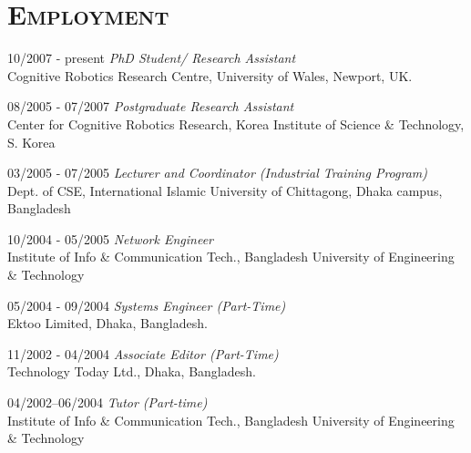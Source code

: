 \documentclass[notopicbreak,contbibnum,plain]{simplecv}
\begin{document}
\section{\textsc{Employment}}
\begin{topic}
	\item[10/2007 - present] \textit{PhD Student/ Research Assistant}\\
    Cognitive Robotics Research Centre,
    University of Wales, Newport, UK.
\vspace*{-0.1cm}    
    \item[08/2005 - 07/2007] \textit{Postgraduate Research Assistant\\}
    Center for Cognitive Robotics Research,
    Korea Institute of Science \& Technology, S. Korea
\vspace*{-0.1cm}
\item[03/2005 - 07/2005] \textit{Lecturer and Coordinator (Industrial Training Program)}\\
	Dept. of CSE, International Islamic University of Chittagong, Dhaka campus, Bangladesh
\vspace*{-0.1cm}    
    \item[10/2004 - 05/2005] \textit{Network Engineer}\\
	Institute of Info \& Communication Tech.,
	Bangladesh University of Engineering \& Technology
\vspace*{-0.1cm}
	\item[05/2004 - 09/2004]\textit{ Systems Engineer (Part-Time)}\\
	Ektoo Limited, Dhaka, Bangladesh.
\vspace*{-0.1cm}
	\item[11/2002 - 04/2004] \textit{Associate Editor (Part-Time)}\\
	Technology Today Ltd., Dhaka, Bangladesh.
\vspace*{-0.1cm}
	\item[04/2002--06/2004] \textit{Tutor (Part-time)}\\
	 Institute of Info \& Communication Tech.,
	Bangladesh University of Engineering \& Technology        
\end{topic}
\vspace*{-0.1cm}
\end{document}
